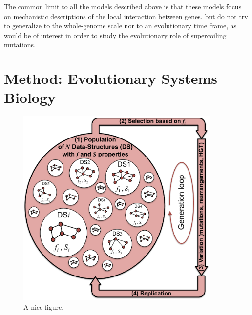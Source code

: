 The common limit to all the models described above is that these models focus on mechanistic descriptions of the local interaction between genes, but do not try to generalize to the whole-genome scale nor to an evolutionary time frame, as would be of interest in order to study the evolutionary role of supercoiling mutations.

\section{Method: Evolutionary Systems Biology}

\begin{figure}
\centering
\includegraphics[width=0.9\textwidth]{background/img/evol_sys_bio.pdf}
\caption{A nice figure.}
\label{fig:background:evol-sys-bio}
\end{figure}

